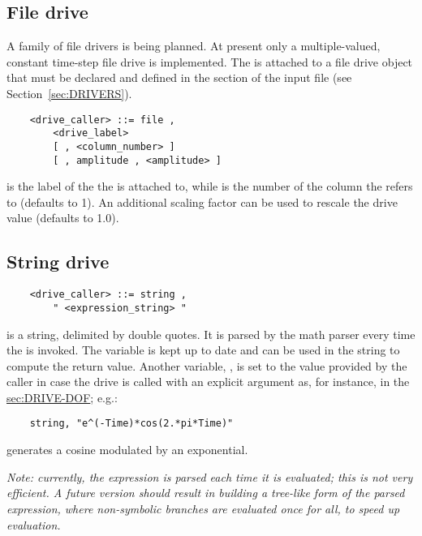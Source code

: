 \subsection{File drive}\label{sec:FILE-DRIVE}
A family of file drivers is being planned.
At present only a multiple-valued, constant time-step file drive is
implemented.
The  is attached to a file drive object that must be declared
and defined in the  section 
of the input file (see Section~\ref{sec:DRIVERS}).
\begin{verbatim}
    <drive_caller> ::= file ,
        <drive_label>
        [ , <column_number> ]
        [ , amplitude , <amplitude> ]
\end{verbatim}
 is the label of the  
the  is attached to, while
 is the number of the column the 
refers to (defaults to 1).
An additional scaling factor  can be used to rescale
the drive value (defaults to 1.0).

\subsection{String drive}
\begin{verbatim}
    <drive_caller> ::= string ,
        " <expression_string> "
\end{verbatim}
 is a string, delimited by double quotes.
It is parsed by the math parser every time 
the  is invoked.
The variable  is kept up to date and can be used in the 
string to compute the return value.
Another variable, , is set to the value provided by the caller
in case the drive is called with an explicit argument as, for instance,
in the \hyperref{dof drive}{dof drive (see Section~}{)}{sec:DRIVE-DOF};
e.g.:
\begin{verbatim}
    string, "e^(-Time)*cos(2.*pi*Time)"
\end{verbatim}
generates a cosine modulated by an exponential.

\noindent
\emph{Note: currently, the expression is parsed each time it is evaluated;
this is not very efficient.
A future version should result in building a tree-like form of the
parsed expression, where non-symbolic branches are evaluated once for all,
to speed up evaluation.}


